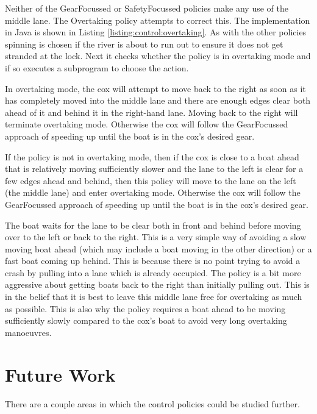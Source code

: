 Neither of the GearFocussed or SafetyFocussed policies make any use of the middle lane. The Overtaking policy  attempts to correct this. The implementation in Java is shown in Listing \ref{listing:control:overtaking}. As with the other policies spinning is chosen if the river is about to run out to ensure it does not get stranded at the lock. Next it checks whether the policy is in overtaking mode and if so executes a subprogram to choose the action.

In overtaking mode, the cox will attempt to move back to the right as soon as it has completely moved into the middle lane and there are enough edges clear both ahead of it and behind it in the right-hand lane. Moving back to the right will terminate overtaking mode. Otherwise the cox will follow the GearFocussed approach of speeding up until the boat is in the cox's desired gear.

If the policy is not in overtaking mode, then if the cox is close to a boat ahead that is relatively moving sufficiently slower and the lane to the left is clear for a few edges ahead and behind, then this policy will move to the lane on the left (the middle lane) and enter overtaking mode. Otherwise the cox will follow the GearFocussed approach of speeding up until the boat is in the cox's desired gear.

The boat waits for the lane to be clear both in front and behind before moving over to the left or back to the right. This is a very simple way of avoiding a slow moving boat ahead (which may include a boat moving in the other direction) or a fast boat coming up behind. This is because there is no point trying to avoid a crash by pulling into a lane which is already occupied. The policy is a bit more aggressive about getting boats back to the right than initially pulling out. This is in the belief that it is best to leave this middle lane free for overtaking as much as possible. This is also why the policy requires a boat ahead to be moving sufficiently slowly compared to the cox's boat to avoid very long overtaking manoeuvres.




\section{Future Work}
There are a couple areas in which the control policies could be studied further.

